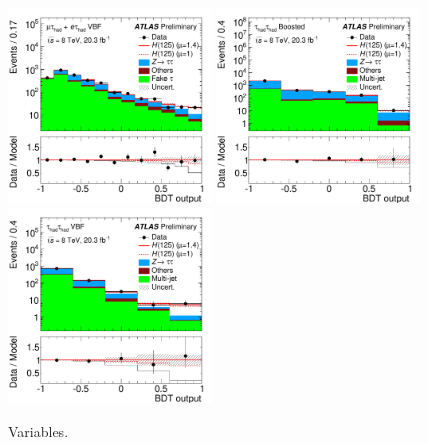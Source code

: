 \begin{figure}[tp]
  \includegraphics[width=0.48\textwidth]{figures/ATLAS-CONF-2014-061/fig_08c}
  \includegraphics[width=0.48\textwidth]{figures/ATLAS-CONF-2014-061/fig_08f}
  \includegraphics[width=0.48\textwidth]{figures/ATLAS-CONF-2014-061/fig_08e}
  \caption{Variables.}
  \label{fig:results-bdts}
\end{figure}


